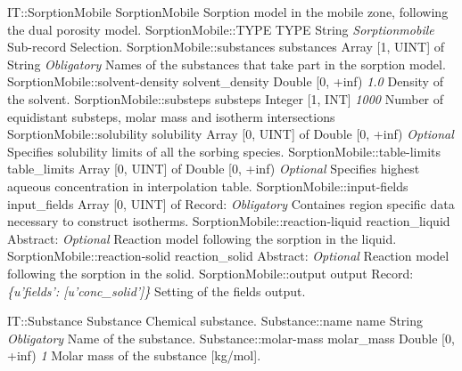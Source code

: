 \begin{RecordType}
	{IT::SorptionMobile}
	{SorptionMobile}
	{} %
	{} %
	{{{Sorption model in the mobile zone, following the dual porosity model.}}}
		\RecKey
			{SorptionMobile::TYPE}
			{TYPE}
			{{String}}
			{ \it{Sorptionmobile} }
			{{{Sub-record Selection.}}}
		\RecKey
			{SorptionMobile::substances}
			{substances}
			{{Array [1, UINT] of }{String}}
			{ \it{Obligatory} }
			{{{Names of the substances that take part in the sorption model.}}}
		\RecKey
			{SorptionMobile::solvent-density}
			{solvent{\_}density}
			{{Double [0, +inf)}}
			{ \it{1.0} }
			{{{Density of the solvent.}}}
		\RecKey
			{SorptionMobile::substeps}
			{substeps}
			{{Integer [1, INT]}}
			{ \it{1000} }
			{{{Number of equidistant substeps, molar mass and isotherm intersections}}}
		\RecKey
			{SorptionMobile::solubility}
			{solubility}
			{{Array [0, UINT] of }{Double [0, +inf)}}
			{ \it{Optional} }
			{{{Specifies solubility limits of all the sorbing species.}}}
		\RecKey
			{SorptionMobile::table-limits}
			{table{\_}limits}
			{{Array [0, UINT] of }{Double [0, +inf)}}
			{ \it{Optional} }
			{{{Specifies highest aqueous concentration in interpolation table.}}}
		\RecKey
			{SorptionMobile::input-fields}
			{input{\_}fields}
			{{Array [0, UINT] of }{Record}{: }}
			{ \it{Obligatory} }
			{{{Containes region specific data necessary to construct isotherms.}}}
		\RecKey
			{SorptionMobile::reaction-liquid}
			{reaction{\_}liquid}
			{{Abstract}{: }}
			{ \it{Optional} }
			{{{Reaction model following the sorption in the liquid.}}}
		\RecKey
			{SorptionMobile::reaction-solid}
			{reaction{\_}solid}
			{{Abstract}{: }}
			{ \it{Optional} }
			{{{Reaction model following the sorption in the solid.}}}
		\RecKey
			{SorptionMobile::output}
			{output}
			{{Record}{: }}
			{ \it{{\{}u'fields': [u'conc{\_}solid']{\}}} }
			{{{Setting of the fields output.}}}
\end{RecordType}
\begin{RecordType}
	{IT::Substance}
	{Substance}
	{} %
	{} %
	{{{Chemical substance.}}}
		\RecKey
			{Substance::name}
			{name}
			{{String}}
			{ \it{Obligatory} }
			{{{Name of the substance.}}}
		\RecKey
			{Substance::molar-mass}
			{molar{\_}mass}
			{{Double [0, +inf)}}
			{ \it{1} }
			{{{Molar mass of the substance [kg/mol].}}}
\end{RecordType}
